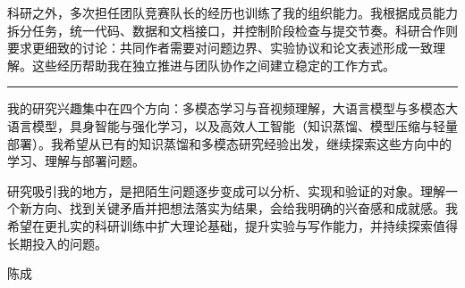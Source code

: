 \documentclass[UTF8,fontset=none,11pt,a4paper]{ctexart}
\newcommand{\statementsection}[1]{%
  \Needspace{7\baselineskip}%
  \vspace{5pt}%
  \noindent{\large\bfseries\color{accent}#1}\par
  \vspace{-3pt}\noindent\textcolor{line}{\rule{\textwidth}{0.65pt}}\vspace{3pt}%
}
\begin{document}
科研之外，多次担任团队竞赛队长的经历也训练了我的组织能力。我根据成员能力拆分任务，统一代码、数据和文档接口，并控制阶段检查与提交节奏。科研合作则要求更细致的讨论：共同作者需要对问题边界、实验协议和论文表述形成一致理解。这些经历帮助我在独立推进与团队协作之间建立稳定的工作方式。

\statementsection{未来计划}

我的研究兴趣集中在四个方向：多模态学习与音视频理解，大语言模型与多模态大语言模型，具身智能与强化学习，以及高效人工智能（知识蒸馏、模型压缩与轻量部署）。我希望从已有的知识蒸馏和多模态研究经验出发，继续探索这些方向中的学习、理解与部署问题。

研究吸引我的地方，是把陌生问题逐步变成可以分析、实现和验证的对象。理解一个新方向、找到关键矛盾并把想法落实为结果，会给我明确的兴奋感和成就感。我希望在更扎实的科研训练中扩大理论基础，提升实验与写作能力，并持续探索值得长期投入的问题。

\vfill
\begin{flushright}
  陈成
\end{flushright}
\end{document}
